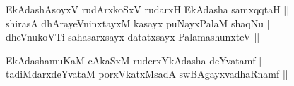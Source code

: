 \begin{entry}
\smallskip
\begin{shl}
EkAdashAsoyxV rudArxkoSxV rudarxH EkAdasha samxqqtaH ||\\
shirasA dhArayeVninxtayxM kasayx puNayxPalaM shaqNu |\\
dheVnukoVTi sahasarxsayx datatxsayx PalamashunxteV ||
\end{shl}
\medskip
{}
\smallskip
\begin{shl}
EkAdashamuKaM cAkaSxM ruderxYkAdasha deYvatamf |\\
tadiMdarxdeYvataM porxVkatxMsadA swBAgayxvadhaRnamf ||
\end{shl}
\medskip
{}
\end{entry}

